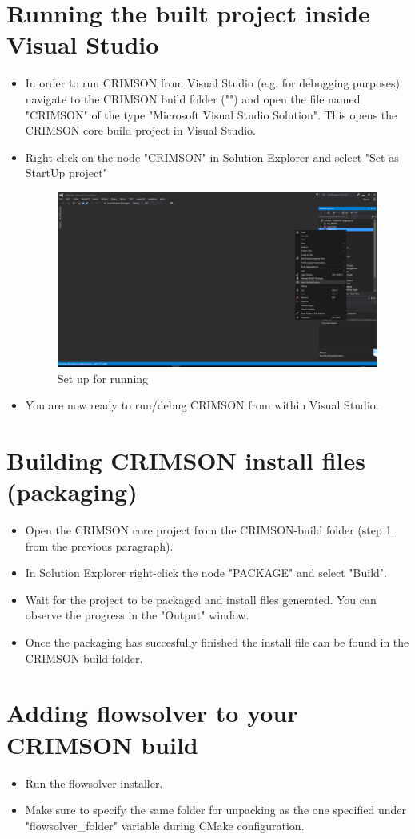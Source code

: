 \documentclass[]{scrartcl}
\begin{document}
\section{Running the built project inside Visual Studio}
\begin{itemize}
	\item In order to run CRIMSON from Visual Studio (e.g. for debugging purposes) navigate to the CRIMSON build folder ("") and open the file named "CRIMSON" of the type "Microsoft Visual Studio Solution". This opens the CRIMSON core build project in Visual Studio.
	\item Right-click on the node "CRIMSON" in Solution Explorer and select "Set as StartUp project"
	
	\begin{figure}[H]
		\centering
		\includegraphics[width=0.9\linewidth]{Images/vs3}
		\caption{Set up for running}
		\label{fig:vs3}
	\end{figure}
	
	\item You are now ready to run/debug CRIMSON from within Visual Studio.
\end{itemize}

\section{Building CRIMSON install files (packaging)}

\begin{itemize}
	\item Open the CRIMSON core project from the CRIMSON-build folder (step 1. from the previous paragraph).
	\item In Solution Explorer right-click the node "PACKAGE" and select "Build".
	\item Wait for the project to be packaged and install files generated. You can observe the progress in the "Output" window.
	\item Once the packaging has succesfully finished the install file can be found in the CRIMSON-build folder.
\end{itemize}

\section{Adding flowsolver to your CRIMSON build}

\begin{itemize}
	\item Run the flowsolver installer. 
	\item Make sure to specify the same folder for unpacking as the one specified under "flowsolver\_folder" variable during CMake configuration.
\end{itemize}
\end{document}
